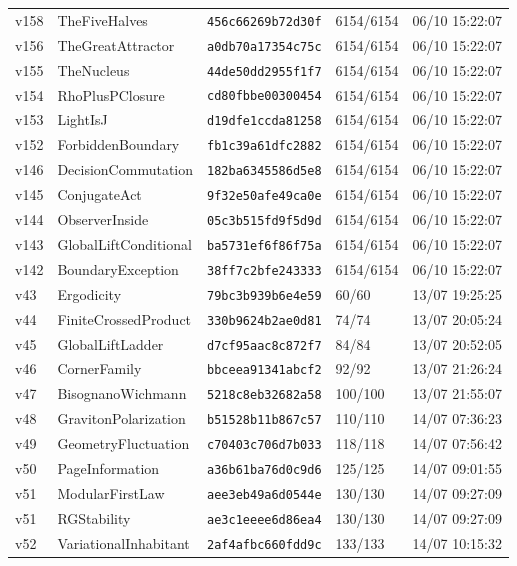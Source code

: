 \documentclass[11pt]{article}
\theoremstyle{definition}\newtheorem{deriv}{Derivation}
\begin{document}
{\begin{longtable}{@{}lllll@{}}
v158 & TheFiveHalves & \texttt{456c66269b72d30f} & 6154/6154 & 06/10 15:22:07 \\
v156 & TheGreatAttractor & \texttt{a0db70a17354c75c} & 6154/6154 & 06/10 15:22:07 \\
v155 & TheNucleus & \texttt{44de50dd2955f1f7} & 6154/6154 & 06/10 15:22:07 \\
v154 & RhoPlusPClosure & \texttt{cd80fbbe00300454} & 6154/6154 & 06/10 15:22:07 \\
v153 & LightIsJ & \texttt{d19dfe1ccda81258} & 6154/6154 & 06/10 15:22:07 \\
v152 & ForbiddenBoundary & \texttt{fb1c39a61dfc2882} & 6154/6154 & 06/10 15:22:07 \\
v146 & DecisionCommutation & \texttt{182ba6345586d5e8} & 6154/6154 & 06/10 15:22:07 \\
v145 & ConjugateAct & \texttt{9f32e50afe49ca0e} & 6154/6154 & 06/10 15:22:07 \\
v144 & ObserverInside & \texttt{05c3b515fd9f5d9d} & 6154/6154 & 06/10 15:22:07 \\
v143 & GlobalLiftConditional & \texttt{ba5731ef6f86f75a} & 6154/6154 & 06/10 15:22:07 \\
v142 & BoundaryException & \texttt{38ff7c2bfe243333} & 6154/6154 & 06/10 15:22:07 \\
v43 & Ergodicity & \texttt{79bc3b939b6e4e59} & 60/60 & 13/07 19:25:25 \\
v44 & FiniteCrossedProduct & \texttt{330b9624b2ae0d81} & 74/74 & 13/07 20:05:24 \\
v45 & GlobalLiftLadder & \texttt{d7cf95aac8c872f7} & 84/84 & 13/07 20:52:05 \\
v46 & CornerFamily & \texttt{bbceea91341abcf2} & 92/92 & 13/07 21:26:24 \\
v47 & BisognanoWichmann & \texttt{5218c8eb32682a58} & 100/100 & 13/07 21:55:07 \\
v48 & GravitonPolarization & \texttt{b51528b11b867c57} & 110/110 & 14/07 07:36:23 \\
v49 & GeometryFluctuation & \texttt{c70403c706d7b033} & 118/118 & 14/07 07:56:42 \\
v50 & PageInformation & \texttt{a36b61ba76d0c9d6} & 125/125 & 14/07 09:01:55 \\
v51 & ModularFirstLaw & \texttt{aee3eb49a6d0544e} & 130/130 & 14/07 09:27:09 \\
v51 & RGStability & \texttt{ae3c1eeee6d86ea4} & 130/130 & 14/07 09:27:09 \\
v52 & VariationalInhabitant & \texttt{2af4afbc660fdd9c} & 133/133 & 14/07 10:15:32 \\

\end{longtable}}
\end{document}
